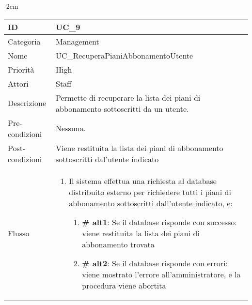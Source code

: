 \begin{center}
\begin{table}[bp]
    \centering
    \addtolength{\leftskip} {-2cm}
\begin{tabular}{ |p{2.6cm}|p{13cm}|  }
\hline
ID & UC\_9 \\\hline
Categoria & Management\\\hline
Nome & UC\_RecuperaPianiAbbonamentoUtente\\\hline
Priorità & High \\\hline
Attori &  Staff \\\hline
Descrizione & Permette di recuperare la lista dei piani di abbonamento sottoscritti da un utente.\\\hline
Pre-condizioni &  Nessuna.\\\hline
Post-condizioni &  Viene restituita la lista dei piani di abbonamento sottoscritti dal'utente indicato\\\hline
Flusso &  	\begin{enumerate}	
		\item Il sistema effettua una richiesta al database distribuito esterno per richiedere tutti i piani di abbonamento sottoscritti dall'utente indicato, e:
			\begin{enumerate}[  ]
			\item \textbf{\# alt1}: Se il database risponde con successo: viene restituita la lista dei piani di abbonamento trovata
			\item \textbf{\# alt2}: Se il database risponde con errori: viene mostrato l'errore all'amministratore, e la procedura viene abortita
			\end{enumerate}
		\end{enumerate}\\\hline
\end{tabular}
\label{table_use_case:9}\newline
\end{table}



\end{center}
